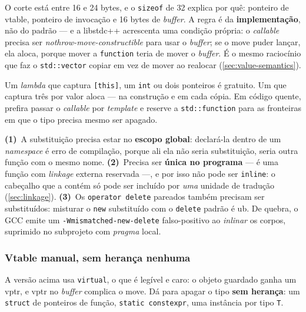 O corte está entre 16 e 24 bytes, e o \texttt{sizeof} de 32 explica por quê:
ponteiro de vtable, ponteiro de invocação e 16 bytes de \emph{buffer}. A regra é
da \textbf{implementação}, não do padrão --- e a libstdc++ acrescenta uma
condição própria: o \emph{callable} precisa ser
\emph{nothrow-move-constructible} para usar o \emph{buffer}; se o \gls{move}
puder lançar, ela aloca, porque mover a \texttt{function} teria de mover o
\emph{buffer}. É o mesmo raciocínio que faz o \texttt{std::vector} copiar em vez
de mover ao realocar (\cref{sec:value-semantics}).

\begin{regra}
Um \emph{lambda} que captura \texttt{[this]}, um \texttt{int} ou dois ponteiros
é gratuito. Um que captura três  por valor aloca --- na
construção e em cada cópia. Em código quente, prefira passar o \emph{callable}
por \emph{template} e reserve a \texttt{std::function} para as fronteiras em que
o tipo precisa mesmo ser apagado.
\end{regra}

\begin{armadilha}
\textbf{(1)}~A substituição precisa estar no \textbf{escopo global}:
declará-la dentro de um \emph{namespace} é erro de compilação, porque ali ela
não seria substituição, seria outra função com o mesmo nome. \textbf{(2)}~Precisa
ser \textbf{única no programa} --- é uma função com \emph{linkage} externa
reservada ---, e por isso não pode ser \texttt{inline}: o cabeçalho que a contém
só pode ser incluído por \emph{uma} unidade de tradução (\cref{sec:linkage}).
\textbf{(3)}~Os \texttt{operator delete} pareados também precisam ser
substituídos: misturar o \texttt{new} substituído com o \texttt{delete} padrão é
\gls{ub}. De quebra, o GCC emite um \texttt{-Wmismatched-new-delete}
falso-positivo ao \emph{inlinar} os corpos, suprimido no subprojeto com
\emph{pragma} local.
\end{armadilha}

\subsubsection{Vtable manual, sem herança nenhuma}

A versão acima usa \texttt{virtual}, o que é legível e caro: o objeto guardado
ganha um vptr, e vptr no \emph{buffer} complica o \gls{move}. Dá para apagar o
tipo \textbf{sem herança}: um \texttt{struct} de ponteiros de função,
\texttt{static constexpr}, uma instância por tipo \texttt{T}.

